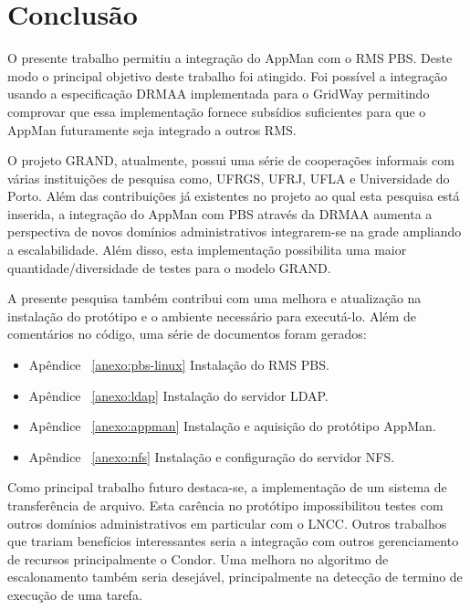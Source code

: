 \chapter{Conclusão}
\label{cap:conclusao}

O presente trabalho permitiu a integração do AppMan com o RMS PBS. Deste modo o principal objetivo deste trabalho foi atingido. Foi possível a integração usando a especificação DRMAA implementada para o GridWay permitindo comprovar que essa implementação fornece subsídios suficientes para que o AppMan futuramente seja integrado a outros RMS. 

O projeto GRAND, atualmente, possui uma série de cooperações informais com várias instituições de pesquisa como, UFRGS, UFRJ, UFLA e Universidade do Porto. Além das contribuições já existentes no projeto ao qual esta pesquisa está inserida, a integração do AppMan com PBS através da DRMAA aumenta a perspectiva de novos domínios administrativos integrarem-se na grade ampliando a escalabilidade. Além disso, esta implementação possibilita uma maior quantidade/diversidade de testes para o modelo GRAND. 

A presente pesquisa também contribui com uma melhora e atualização na instalação do protótipo e o ambiente necessário para executá-lo. Além de comentários no código, uma série de documentos foram gerados:

\begin{itemize}
	\item Apêndice ~\ref{anexo:pbs-linux} Instalação do RMS PBS.
	\item Apêndice ~\ref{anexo:ldap} Instalação do servidor LDAP.
	\item Apêndice ~\ref{anexo:appman} Instalação e aquisição do protótipo AppMan.
	\item Apêndice ~\ref{anexo:nfs} Instalação e configuração do servidor NFS.
\end{itemize}

Como principal trabalho futuro destaca-se, a implementação de um sistema de transferência de arquivo. Esta carência no protótipo impossibilitou testes com outros domínios administrativos em particular com o LNCC. Outros trabalhos que trariam benefícios interessantes seria a integração com outros gerenciamento de recursos principalmente o Condor. Uma melhora no algoritmo de escalonamento também seria desejável, principalmente na detecção de termino de execução de uma tarefa.